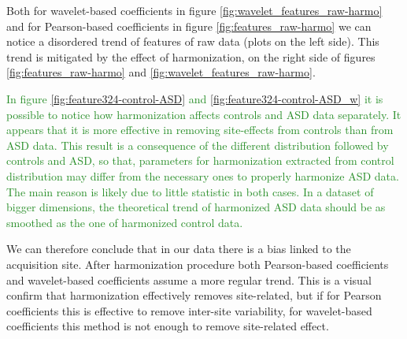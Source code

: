 \documentclass[11pt]{report}
\begin{document}
\hfill

Both for wavelet-based coefficients in figure \ref{fig:wavelet_features_raw-harmo} and for Pearson-based coefficients in figure \ref{fig:features_raw-harmo} we can notice a disordered trend of features of raw data (plots on the left side).
This trend is mitigated by the effect of harmonization, on the right side of figures  \ref{fig:features_raw-harmo} and \ref{fig:wavelet_features_raw-harmo}.

\textcolor{ForestGreen}{
In figure \ref{fig:feature324-control-ASD} and \ref{fig:feature324-control-ASD_w} it is possible to notice how harmonization affects controls and ASD data separately.
It appears that it is more effective in removing site-effects from controls than from ASD data.
This result is a consequence of the different distribution followed by controls and ASD, so that, parameters for harmonization extracted from control distribution may differ from the necessary ones to properly harmonize ASD data. The main reason is likely due to little statistic in both cases.
In a dataset of bigger dimensions, the theoretical trend of harmonized ASD data should be as smoothed as the one of harmonized control data.
}

We can therefore conclude that in our data there is a bias linked to the acquisition site.
After harmonization procedure both Pearson-based coefficients and wavelet-based coefficients assume a more regular trend.
This is a visual confirm that harmonization effectively removes site-related, but if for Pearson coefficients this is effective to remove inter-site variability, for wavelet-based coefficients this method is not enough to remove site-related effect.

\end{document}

